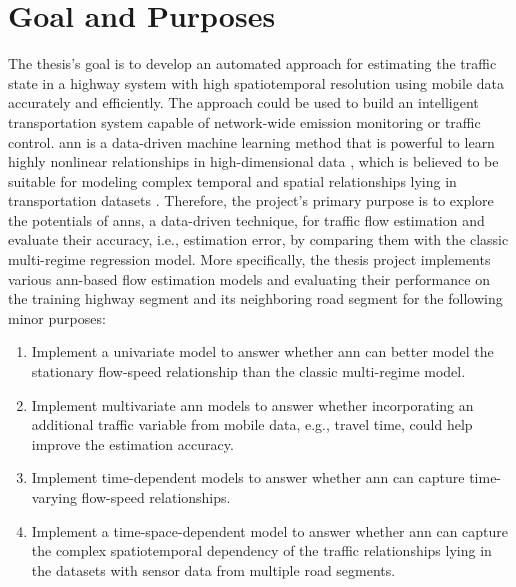 \documentclass[english]{kththesis}
\begin{document}
\section{Goal and Purposes}
The thesis's goal is to develop an automated approach for estimating the traffic state in a highway system with high spatiotemporal resolution using mobile data accurately and efficiently. The approach could be used to build an intelligent transportation system capable of network-wide emission monitoring or traffic control. \gls{ann} is a data-driven machine learning method that is powerful to learn highly nonlinear relationships in high-dimensional data \cite{ma_lstm_predict}, which is believed to be suitable for modeling complex temporal and spatial relationships lying in transportation datasets \cite{vlahogianni_forecast_overview}. Therefore, the project's primary purpose is to explore the potentials of \glspl{ann}, a data-driven technique, for traffic flow estimation and evaluate their accuracy, i.e., estimation error, by comparing them with the classic multi-regime regression model. More specifically, the thesis project implements various \gls{ann}-based flow estimation models and evaluating their performance on the training highway segment and its neighboring road segment for the following minor purposes:
\begin{enumerate}
    \item Implement a univariate model to answer whether \gls{ann} can better model the stationary flow-speed relationship than the classic multi-regime model.
    \item Implement multivariate \gls{ann} models to answer whether incorporating an additional traffic variable from mobile data, e.g., travel time, could help improve the estimation accuracy.
    \item Implement time-dependent models to answer whether \gls{ann} can capture time-varying flow-speed relationships.
    \item Implement a time-space-dependent model to answer whether \gls{ann} can capture the complex spatiotemporal dependency of the traffic relationships lying in the datasets with sensor data from multiple road segments.
\end{enumerate}
\end{document}

